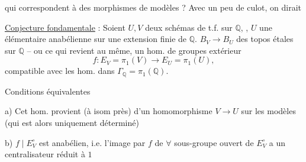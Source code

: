qui correspondent à des morphismes de modèles ? Avec un peu de culot, on dirait

\uline{Conjecture fondamentale} : Soient $U,V$ deux schémas de t.f. sur $\mathbb{Q}$,  , $U$ une   élémentaire anabélienne sur une extension finie de $\mathbb{Q}$.     $B_V\longrightarrow B_U$ des topos étales sur $\mathbb{Q}$ -- ou ce qui revient au même, un hom. de groupes extérieur
\[
f:E_V=\pi_1(V)\longrightarrow E_U=\pi_1(U),
\]
compatible avec les hom. dans $\Gamma_{\mathbb{Q}}=\pi_1(\mathbb{Q})$.

Conditions équivalentes

 a) Cet hom. provient (à isom près) d'un homomorphisme $V\longrightarrow U$ sur les modèles (qui est alors uniquement déterminé)

 b) $f\mid E_V^\circ$ est anabélien, i.e. l'image par $f$ de $\forall$ sous-groupe ouvert de $E_V^\circ$ a un centralisateur réduit à $1$

